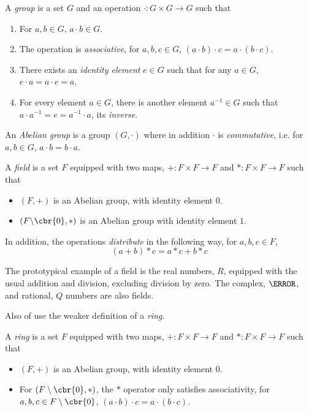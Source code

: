 \begin{definition}[Group]
	A \emph{group} is a set \(G\) and an operation \(\cdot: G\times G\to G\) such that 
	\begin{enumerate}
		\item For \(a,b\in G\), \(a \cdot b \in G\).
		\item The operation is \emph{associative}, for \(a, b, c \in G\), \((a \cdot b) \cdot c = a \cdot (b\cdot c)\).
		\item There exists an \emph{identity element} \(e\in G\) such that for any \(a \in G\), \(e\cdot a = a \cdot e = a\).
		\item For every element \(a \in G\), there is another element \(a^{-1} \in G\) such that \(a \cdot a^{-1} = e = a^{-1}\cdot a\), its \emph{inverse}.
	\end{enumerate}
\end{definition}

\begin{definition}
	An \emph{Abelian group} is a group \((G, \cdot)\) where in addition \(\cdot\) is \emph{commutative}, i.e. for \(a, b \in G\), \(a \cdot b = b \cdot a\).
\end{definition}

\begin{definition}[Field]
	A \emph{field} is a set \(F\) equipped with two maps, \(+: F\times F\to F\) and \(*: F\times F\to F\) such that
	\begin{itemize}
		\item \((F, +)\) is an Abelian group, with identity element \(0\).
		\item \((F\backslash\cbr{0}, *)\) is an Abelian group with identity element \(1\).
	\end{itemize}
	In addition, the operations \emph{distribute} in the following way, for \(a, b, c \in F\),
	\[(a + b) * c = a*c + b*c\]
\end{definition}

The prototypical example of a field is the real numbers, \(R\), equipped with the usual addition and division, excluding division by zero. The complex, \(\C\), and rational, \(Q\) numbers are also fields.

Also of use the weaker definition of a \emph{ring}.

\begin{definition}[Ring]
	\label{def:ring}
	A \emph{ring} is a set \(F\) equipped with two maps, \(+: F\times F\to F\) and \(*: F\times F\to F\) such that
	\begin{itemize}
		\item \((F, +)\) is an Abelian group, with identity element \(0\).
		\item For \((F\takeaway\cbr{0}, *)\), the \(*\) operator only satisfies associativity, for \(a, b, c \in F\takeaway\cbr{0}\), \((a \cdot b) \cdot c = a \cdot (b\cdot c).\)
	\end{itemize}
\end{definition}

